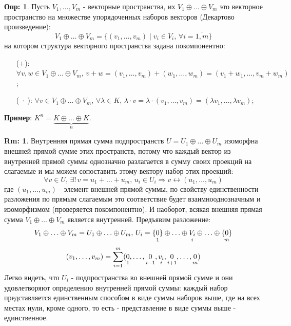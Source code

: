 \documentclass[12pt]{article}
\theoremstyle{definition}
\newtheorem{defn}{Опр:}
\newtheorem{rem}{Rm:}
\newcommand{\ddsum}[2]{\displaystyle\sum\limits_{#1}^{#2}}
\begin{document}
\begin{defn}
	Пусть $V_1, \dotsc, V_m$ - векторные  пространства, их  $V_1 \oplus \dotsc \oplus V_m$ это векторное пространство на множестве упорядоченных наборов векторов (Декартово произведение):
	$$
		V_1 \oplus \dotsc \oplus V_m = \{(v_1, \dotsc, v_m) \mid v_i \in V_i, \, \forall i = \overline{1,m}\}
	$$
	на котором структура векторного пространства задана покомпонентно:
	\begin{enumerate}
		\item[($+$):] 	$\forall v,w \in V_1 \oplus \dotsc \oplus V_m, \, v + w = (v_1 ,\dotsc, v_m)  + (w_1,\dotsc, w_m) = (v_1 + w_1, \dotsc , v_m + w_m)$;
		\item[($\; \cdot \; $):] $\forall v \in V_1 \oplus \dotsc \oplus V_m, \, \forall \lambda \in K, \, \lambda {\cdot}v = \lambda {\cdot} (v_1 ,\dotsc, v_m) = (\lambda v_1, \dotsc, \lambda v_m)$;
	\end{enumerate}
\end{defn}

\textbf{Пример}: $K^n = \underbrace{K \oplus  \dotsc \oplus K}_{n}$.

\begin{rem}
	Внутренняя прямая сумма подпространств $U = U_1 \oplus \dotsc \oplus U_m$ изоморфна внешней прямой сумме этих пространств, потому что каждый вектор из внутренней прямой суммы однозначно разлагается в сумму своих проекций на слагаемые и мы можем сопоставить этому вектору набор этих проекций:
	$$
		\forall v \in U, \, \exists! \, v = u_1 + \dotsc + u_m,\, u_i \in U_i \Rightarrow v \leftrightarrow (u_1,\dotsc, u_m) 
	$$
	где $(u_1,\dotsc, u_m)$ - элемент внешней прямой суммы, по свойству единственности разложения по прямым слагаемым это соответствие будет взаимнооднозначным и изоморфизмом (проверяется покомпонентно). И наоборот, всякая внешняя прямая сумма $V_1 \oplus \dotsc \oplus V_m$ является внутренней. Предъявим разложение:
	$$
		V_1 \oplus \dotsc \oplus V_m = U_1 \oplus \dotsc \oplus U_m, \, U_i = \underset{1}{\{0\}} \oplus \dotsc \oplus \underset{i}{V_i\vphantom{\{0\}}} \oplus \dotsc \oplus \underset{m}{\{0\}}
	$$
	$$
		(v_1,\dotsc,v_m) = \ddsum{i = 1}{m}(\underset{1}{0\vphantom{v_i}}, \dotsc, \underset{i-1}{0\vphantom{v_i}}, \underset{i}{v_i}, \underset{i+1}{0\vphantom{v_i}}, \dotsc, \underset{m}{0\vphantom{v_i}})
	$$
	Легко видеть, что $U_i$ - подпространства во внешней прямой сумме и они удовлетворяют определению внутренней прямой суммы: каждый набор представляется единственным способом в виде суммы наборов выше, где на всех местах нули, кроме одного, то есть - представление в виде суммы выше - единственное.
\end{rem}
\end{document}
